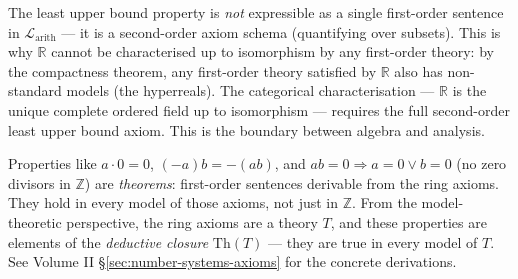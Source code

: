 \begin{remark}
The least upper bound property is \emph{not} expressible as a single
first-order sentence in $\mathcal{L}_{\mathrm{arith}}$ — it is a
second-order axiom schema (quantifying over subsets).
This is why $\mathbb{R}$ cannot be characterised up to isomorphism
by any first-order theory: by the compactness theorem, any first-order
theory satisfied by $\mathbb{R}$ also has non-standard models
(the hyperreals).
The categorical characterisation — $\mathbb{R}$ is the unique complete
ordered field up to isomorphism — requires the full second-order
least upper bound axiom.
This is the boundary between algebra and analysis.
\end{remark}

\begin{remark}
Properties like $a \cdot 0 = 0$, $(-a)b = -(ab)$, and
$ab = 0 \Rightarrow a = 0 \lor b = 0$ (no zero divisors in $\mathbb{Z}$)
are \emph{theorems}: first-order sentences derivable from the ring axioms.
They hold in every model of those axioms, not just in $\mathbb{Z}$.
From the model-theoretic perspective, the ring axioms are a theory $T$,
and these properties are elements of the \emph{deductive closure}
$\mathrm{Th}(T)$ — they are true in every model of $T$.
See Volume II \S\ref{sec:number-systems-axioms} for the concrete
derivations.
\end{remark}